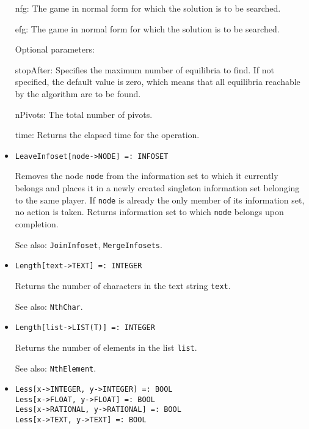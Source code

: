 \begin{itemize}
\bd
\item
[nfg:] The game in normal form for which the solution is to be
searched.
\item
[efg:] The game in normal form for which the solution is to be
searched.
\ed

\item
[Optional parameters:]\hfil\null

\bd
\item
[stopAfter:] Specifies the maximum number of equilibria to find.  If
not specified, the default value is zero, which means that all
equilibria reachable by the algorithm are to be found.
\item
[nPivots:] The total number of pivots. 
\item
[time:] Returns the elapsed time for the operation.
\ed
\ed

\item
\protect \large \begin{verbatim}
LeaveInfoset[node->NODE] =: INFOSET
\end{verbatim}\normalsize

\bd
Removes the node \verb+node+ from the information set to
which it currently belongs and places it in a newly created
singleton information set belonging to the same player.  If \verb+node+
is already the only member of its information set, no action is taken.
Returns information set to which \verb+node+ belongs upon completion.
\item
[See also:] {\tt JoinInfoset}, {\tt MergeInfosets}.
\ed

\item
\protect \large \begin{verbatim}
Length[text->TEXT] =: INTEGER
\end{verbatim}\normalsize

\bd
Returns the number of characters in the text string
\verb+text+.
\item
[See also:] {\tt NthChar}.
\ed

\item
\protect \large \begin{verbatim}
Length[list->LIST(T)] =: INTEGER
\end{verbatim}\normalsize

\bd
Returns the number of elements in the list \verb+list+.
\item
[See also:] {\tt NthElement}.
\ed

\item
\protect \large \begin{verbatim}
Less[x->INTEGER, y->INTEGER] =: BOOL
Less[x->FLOAT, y->FLOAT] =: BOOL
Less[x->RATIONAL, y->RATIONAL] =: BOOL
Less[x->TEXT, y->TEXT] =: BOOL
\end{verbatim}\normalsize


\end{itemize}
